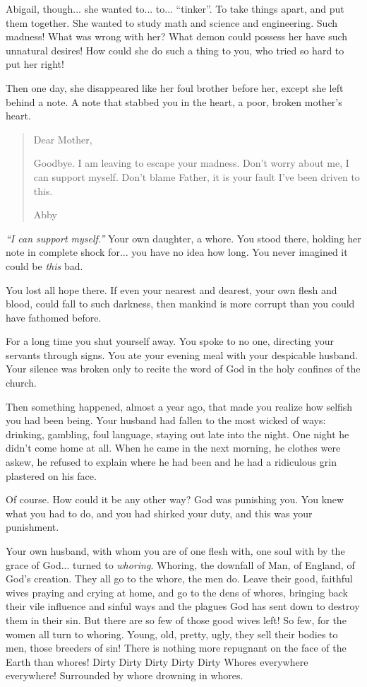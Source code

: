 \documentclass[char]{airship}
\begin{document}
Abigail, though... she wanted to... to... ``tinker''. To take things
apart, and put them together. She wanted to study math and science and
engineering. Such madness! What was wrong with her? What demon could
possess her have such unnatural desires! How could she do such a thing
to you, who tried so hard to put her right!

Then one day, she disappeared like her foul brother before her, except
she left behind a note. A note that stabbed you in the heart, a poor,
broken mother's heart. 

\begin{quote}
Dear Mother,

Goodbye. I am leaving to escape your madness. Don't worry about me, I
can support myself. Don't blame Father, it is your fault I've been
driven to this.

Abby
\end{quote}

{\em ``I can support myself.''} Your own daughter, a whore. You stood
there, holding her note in complete shock for... you have no idea how
long. You never imagined it could be {\em this} bad.

You lost all hope there. If even your nearest and dearest, your own
flesh and blood, could fall to such darkness, then mankind is more
corrupt than you could have fathomed before.

For a long time you shut yourself away. You spoke to no one, directing
your servants through signs. You ate your evening meal with your
despicable husband. Your silence was broken only to recite the word of
God in the holy confines of the church.

Then something happened, almost a year ago, that made you realize how
selfish you had been being. Your husband had fallen to the most wicked
of ways: drinking, gambling, foul language, staying out late into the
night. One night he didn't come home at all. When he came in the next
morning, he clothes were askew, he refused to explain where he had
been and he had a ridiculous grin plastered on his face.

Of course. How could it be any other way? God was punishing you. You
knew what you had to do, and you had shirked your duty, and this was
your punishment.

Your own husband, with whom you are of one flesh with, one soul with
by the grace of God... turned to {\em whoring}. Whoring, the downfall
of Man, of England, of God's creation. They all go to the whore, the
men do. Leave their good, faithful wives praying and crying at home,
and go to the dens of whores, bringing back their vile influence and
sinful ways and the plagues God has sent down to destroy them in their
sin. But there are so few of those good wives left! So few, for the
women all turn to whoring. Young, old, pretty, ugly, they sell their
bodies to men, those breeders of sin! There is nothing more repugnant
on the face of the Earth than whores! Dirty Dirty Dirty Dirty Dirty
Whores everywhere everywhere! Surrounded by whore drowning in whores.
\end{document}
